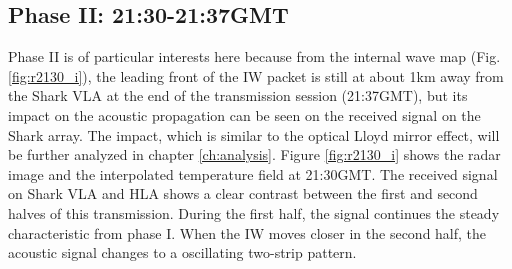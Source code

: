 \subsection{Phase II: 21:30-21:37GMT}
Phase II is of particular interests here because from the internal wave map (Fig. \ref{fig:r2130_i}), the leading front of the IW packet is still at about 1km away from the Shark VLA at the end of the transmission session (21:37GMT), but its impact on the acoustic propagation can be seen on the received signal on the Shark array. The impact, which is similar to the optical Lloyd mirror effect, will be further analyzed in chapter \ref{ch:analysis}.
Figure \ref{fig:r2130_i} shows the radar image and the interpolated temperature field at 21:30GMT. The received signal on Shark VLA and HLA shows a clear contrast between the first and second halves of this transmission. During the first half, the signal continues the steady characteristic from phase I. When the IW moves closer in the second half, the acoustic signal changes to a oscillating two-strip pattern. 
%



